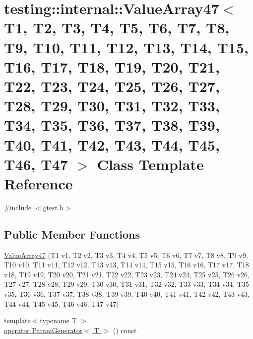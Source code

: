 \hypertarget{classtesting_1_1internal_1_1_value_array47}{\section{testing\-:\-:internal\-:\-:Value\-Array47$<$ T1, T2, T3, T4, T5, T6, T7, T8, T9, T10, T11, T12, T13, T14, T15, T16, T17, T18, T19, T20, T21, T22, T23, T24, T25, T26, T27, T28, T29, T30, T31, T32, T33, T34, T35, T36, T37, T38, T39, T40, T41, T42, T43, T44, T45, T46, T47 $>$ Class Template Reference}
\label{classtesting_1_1internal_1_1_value_array47}
}


{\ttfamily \#include $<$gtest.\-h$>$}

\subsection*{Public Member Functions}
\begin{DoxyCompactItemize}
\item 
\hyperlink{classtesting_1_1internal_1_1_value_array47_aaf4258366a73eb057d5e9c8aec88ec00}{Value\-Array47} (T1 v1, T2 v2, T3 v3, T4 v4, T5 v5, T6 v6, T7 v7, T8 v8, T9 v9, T10 v10, T11 v11, T12 v12, T13 v13, T14 v14, T15 v15, T16 v16, T17 v17, T18 v18, T19 v19, T20 v20, T21 v21, T22 v22, T23 v23, T24 v24, T25 v25, T26 v26, T27 v27, T28 v28, T29 v29, T30 v30, T31 v31, T32 v32, T33 v33, T34 v34, T35 v35, T36 v36, T37 v37, T38 v38, T39 v39, T40 v40, T41 v41, T42 v42, T43 v43, T44 v44, T45 v45, T46 v46, T47 v47)
\item 
{\footnotesize template$<$typename T $>$ }\\\hyperlink{classtesting_1_1internal_1_1_value_array47_a684c55dcf0b7ca78af97ea1764634c58}{operator Param\-Generator$<$ T $>$} () const 
\end{DoxyCompactItemize}


